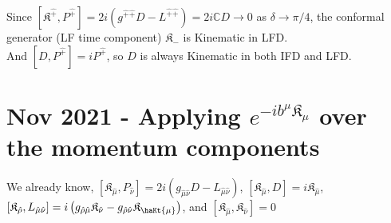 \documentclass[]{article}
\numberwithin{equation}{section}
\begin{document}
{{Since $[\mathfrak{K}^{\hat{+}},P^{\hat{+}}]=2i(g^{\hat{+}\hat{+}}D-L^{\hat{+}\hat{+}})=2i\mathbb{C}D\rightarrow 0$ as $\delta\rightarrow\pi/4$, the conformal generator (LF time component) $\mathfrak{K}_{{-}}$ is Kinematic in LFD.
\\And $[D, P^{\hat{+}}]=iP^{\hat{+}}$, so $D$ is always Kinematic in both IFD and LFD.
\begin{table}[h]
\caption{Kinematic and dynamic generators of the Conformal group for different interpolation angles}
\end{table}






\section{Nov 2021 - Applying $e^{-ib^{\mu} \mathfrak{K}_{\mu}}$ over the momentum components}
We already know, $\left[\mathfrak{K}_{\hat{\mu}},P_{\hat{\nu}}\right]=2i\left(g_{\hat{\mu}\hat{\nu}}D-L_{\hat{\mu}\hat{\nu}}\right)$, $\left[ \mathfrak{K}_{\hat{\mu}},D\right]=i\mathfrak{K}_{\hat{\mu}}$, $\left[\mathfrak{K}_{\hat{\rho}},L_{\hat{\mu}\hat{\nu}}\right]=i\left(g_{\hat{\rho}\hat{\mu}}\mathfrak{K}_{\hat{\nu}}-g_{\hat{\rho}\hat{\nu}}\mathfrak{K}_{\haKt{\mu}}\right)$, and $\left[\mathfrak{K}_{\hat{\mu}},\mathfrak{K}_{\hat{\nu}}\right]=0$  \\

}}
\end{document}
